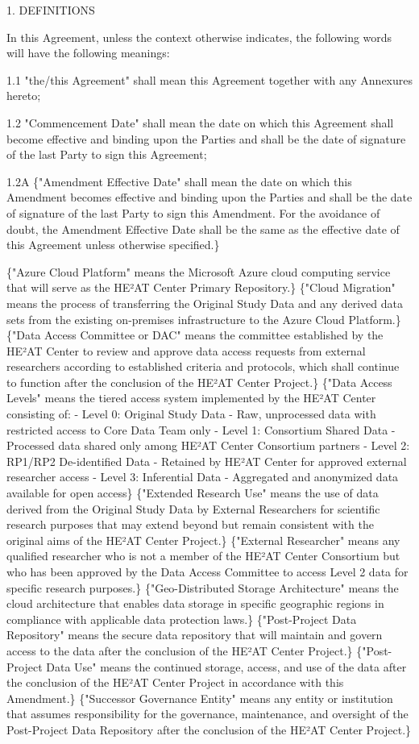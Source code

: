 \documentclass[12pt,letterpaper]{article}
\newcommand{\added}[1]{\textcolor{addcolor}{#1}}
\begin{document}
1.	DEFINITIONS

In this Agreement, unless the context otherwise indicates, the following words will have the following meanings:

1.1	"the/this Agreement" shall mean this Agreement together with any Annexures hereto;

1.2	"Commencement Date" shall mean the date on which this Agreement shall become effective and binding upon the Parties and shall be the date of signature of the last Party to sign this Agreement;

1.2A	\added\{"Amendment Effective Date" shall mean the date on which this Amendment becomes effective and binding upon the Parties and shall be the date of signature of the last Party to sign this Amendment. For the avoidance of doubt, the Amendment Effective Date shall be the same as the effective date of this Agreement unless otherwise specified.\}

\added\{"Azure Cloud Platform" means the Microsoft Azure cloud computing service that will serve as the HE²AT Center Primary Repository.\} \added\{"Cloud Migration" means the process of transferring the Original Study Data and any derived data sets from the existing on-premises infrastructure to the Azure Cloud Platform.\} \added\{"Data Access Committee or DAC" means the committee established by the HE²AT Center to review and approve data access requests from external researchers according to established criteria and protocols, which shall continue to function after the conclusion of the HE²AT Center Project.\} \added\{"Data Access Levels" means the tiered access system implemented by the HE²AT Center consisting of: - Level 0: Original Study Data - Raw, unprocessed data with restricted access to Core Data Team only - Level 1: Consortium Shared Data - Processed data shared only among HE²AT Center Consortium partners - Level 2: RP1/RP2 De-identified Data - Retained by HE²AT Center for approved external researcher access - Level 3: Inferential Data - Aggregated and anonymized data available for open access\} \added\{"Extended Research Use" means the use of data derived from the Original Study Data by External Researchers for scientific research purposes that may extend beyond but remain consistent with the original aims of the HE²AT Center Project.\} \added\{"External Researcher" means any qualified researcher who is not a member of the HE²AT Center Consortium but who has been approved by the Data Access Committee to access Level 2 data for specific research purposes.\} \added\{"Geo-Distributed Storage Architecture" means the cloud architecture that enables data storage in specific geographic regions in compliance with applicable data protection laws.\} \added\{"Post-Project Data Repository" means the secure data repository that will maintain and govern access to the data after the conclusion of the HE²AT Center Project.\} \added\{"Post-Project Data Use" means the continued storage, access, and use of the data after the conclusion of the HE²AT Center Project in accordance with this Amendment.\} \added\{"Successor Governance Entity" means any entity or institution that assumes responsibility for the governance, maintenance, and oversight of the Post-Project Data Repository after the conclusion of the HE²AT Center Project.\}
\end{document}
